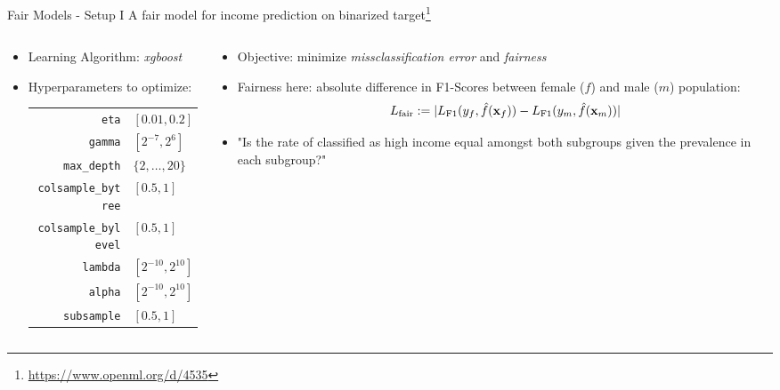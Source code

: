 \begin{frame}{Fair Models - Setup I}
A fair model for income prediction on binarized target\footnote{\url{https://www.openml.org/d/4535}}
\begin{columns}
\begin{column}{0.5\textwidth}
\begin{itemize}
  \item Learning Algorithm: \emph{xgboost}
  \item Hyperparameters to optimize: \\
  \begin{tabular}{rl}
    \texttt{eta} & $[0.01,0.2]$ \\
    \texttt{gamma} & $[2^{-7},2^6]$ \\
    \texttt{max\_depth} & $\{2, \ldots, 20\}$ \\
    \texttt{colsample\_bytree} & $[0.5,1]$ \\
    \texttt{colsample\_bylevel} & $[0.5,1]$ \\
    \texttt{lambda} & $[2^{-10},2^{10}]$ \\
    \texttt{alpha} & $[2^{-10},2^{10}]$ \\
    \texttt{subsample} & $[0.5,1]$ \\
  \end{tabular}
\end{itemize}
\end{column}%
\begin{column}{0.5\textwidth}
\begin{itemize}
  \item Objective: minimize \emph{missclassification error} and \emph{fairness}
  \item Fairness here: absolute difference in F1-Scores between female ($f$) and male ($m$) population:
  \[
  L_{\text{fair}} := |L_{\text{F1}}(y_f,\hat{f}(\mathbf{x}_f)) - L_{\text{F1}}(y_m,\hat{f}(\mathbf{x}_m))|
  \]
  \item "Is the rate of classified as high income equal amongst both subgroups given the prevalence in each subgroup?"
\end{itemize}
\end{column}
\end{columns}

\end{frame}

